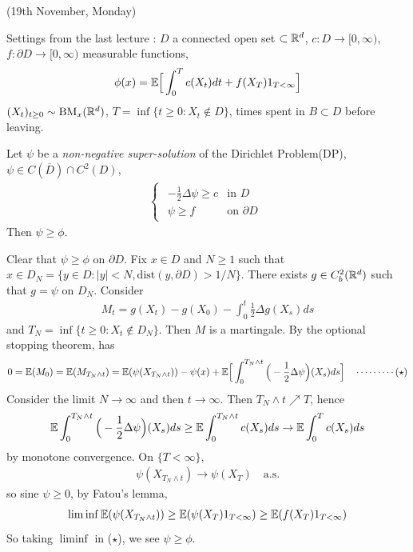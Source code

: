 \documentclass[12pt,a4paper]{report}
\newenvironment{proof}
{\begin{changemargin}{1cm}{0.5cm} 
	}%
	{\end{changemargin}
}
\begin{document}
\newday

(19th November, Monday)
\s

Settings from the last lecture : $D$ a connected open set $\subset \mathbb{R}^d$, $c: D \rightarrow [0,\infty)$, $f: \partial D \rightarrow [0,\infty)$ measurable functions,
\begin{align*}
\phi(x) = \mathbb{E}\Big[ \int_0^T c(X_t) dt + f(X_T) 1_{T<\infty} \Big]
\end{align*}
$(X_t)_{t\geq 0} \sim \text{BM}_x(\mathbb{R}^d)$, $T= \inf \{ t\geq 0 : X_t \not\in D \}$, times spent in $B\subset D$ before leaving.
\s

 Let $\psi$ be a \emph{non-negative super-solution} of the Dirichlet Problem(DP), $\psi \in C(\overline{D}) \cap C^2(D)$,
\begin{align*}
\begin{cases}
\begin{array}{ll}
-\frac{1}{2} \Delta \psi \geq c & \text{in } D \\
\psi \geq f & \text{on } \partial D
\end{array}
\end{cases}
\end{align*}
Then $\psi \geq \phi$.
\begin{proof}
\pf Clear that $\psi \geq \phi$ on $\partial D$. Fix $x\in D$ and $N\geq 1$ such that $x\in D_N = \{ y\in D : |y|<N, \text{dist}(y,\partial D) > 1/N \}$. There exists $g\in C_b^2(\mathbb{R}^d)$ such that $g= \psi$ on $D_N$. Consider
\begin{align*}
M_t = g(X_t) - g(X_0) - \int_0^t \frac{1}{2} \Delta g(X_s) ds
\end{align*}
and $T_N =\inf \{ t\geq 0 : X_t \not\in D_N \}$. Then $M$ is a martingale. By the optional stopping theorem, has
\begin{align*}
0 = \mathbb{E}(M_0) = \mathbb{E}(M_{T_N \wedge t} ) = \mathbb{E}(\psi(X_{T_N \wedge t})) - \psi(x) + \mathbb{E} \Big[ \int_0^{T_N \wedge t} \Big(-\frac{1}{2} \Delta \psi \Big) (X_s) ds \Big]  \quad \cdots \cdots\cdots (\star)
\end{align*}
Consider the limit $N\rightarrow \infty$ and then $t\rightarrow \infty$. Then $T_N \wedge t \nearrow T$, hence
\begin{align*}
\mathbb{E} \int_0^{T_N \wedge t} \Big(-\frac{1}{2} \Delta \psi \Big) (X_s) ds \geq \mathbb{E} \int_0^{T_N \wedge t} c(X_s) ds \rightarrow \mathbb{E} \int_0^T c(X_s) ds
\end{align*}
by monotone convergence. On $\{T < \infty \}$,
\begin{align*}
\psi( X_{T_N \wedge t}) \rightarrow \psi(X_T) \quad \text{a.s.}
\end{align*}
so sine $\psi \geq 0$, by Fatou's lemma,
\begin{align*}
\liminf \mathbb{E}( \psi(X_{T_N \wedge t})) \geq \mathbb{E}(\psi(X_T) 1_{T<\infty}) \geq \mathbb{E}(f(X_T) 1_{T<\infty})
\end{align*}
So taking $\liminf$ in ($\star$), we see $\psi \geq \phi$.

\eop
\end{proof}
\s
\end{document}
